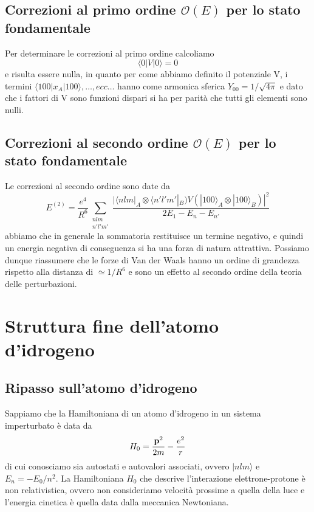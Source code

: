 \subsection{Correzioni al primo ordine $\mathcal{O}(E)$ per lo stato fondamentale}

Per determinare le correzioni al primo ordine calcoliamo
\begin{equation*}
	 \langle 0 | V | 0 \rangle  = 0
\end{equation*}
e risulta essere nulla, in quanto per come abbiamo definito il potenziale V, i termini $\langle 100|x_A|100 \rangle,\ldots, ecc \ldots$ hanno come armonica sferica $Y_{00} = 1/\sqrt{4 \pi }$ e dato che i fattori di V sono funzioni dispari si ha per parit\`a che tutti gli elementi sono nulli.

\subsection{Correzioni al secondo ordine $\mathcal{O}(E)$ per lo stato fondamentale}
Le correzioni al secondo ordine sono date da 
\begin{equation*}
	E^{(2)} = \frac{e^4}{R^6} \sum_{\substack{nlm  \\[0.1cm]  n'l'm'}} \frac{|\langle nlm|_{A}\otimes \langle n'l'm'|_{B})V(|100 \rangle_{A} \otimes |100 \rangle_{B})|^2}{2E_1 -E_n - E_{n'}}
\end{equation*}
abbiamo che in generale la sommatoria restituisce un termine negativo, e quindi un energia negativa di conseguenza si ha una forza di natura attrattiva. Possiamo dunque riassumere che le forze di Van der Waals hanno un ordine di grandezza rispetto alla distanza di $\simeq 1 / R^6$ e sono un effetto al secondo ordine della teoria delle perturbazioni.

\section{Struttura fine dell'atomo d'idrogeno}

\subsection{Ripasso sull'atomo d'idrogeno}

Sappiamo che la Hamiltoniana di un atomo d'idrogeno in un sistema imperturbato \`e data da
\begin{equation*}
	H_0 = \frac{\bold{p}^2}{2m} - \frac{e^2}{r}
\end{equation*} 
di cui conosciamo sia autostati e autovalori associati, ovvero $|nlm \rangle$ e $E_n = -E_0/n^2$. La Hamiltoniana $H_0$ che descrive l'interazione elettrone-protone \`e non relativistica, ovvero non consideriamo velocit\`a prossime a quella della luce e l'energia cinetica \`e quella data dalla meccanica Newtoniana.

